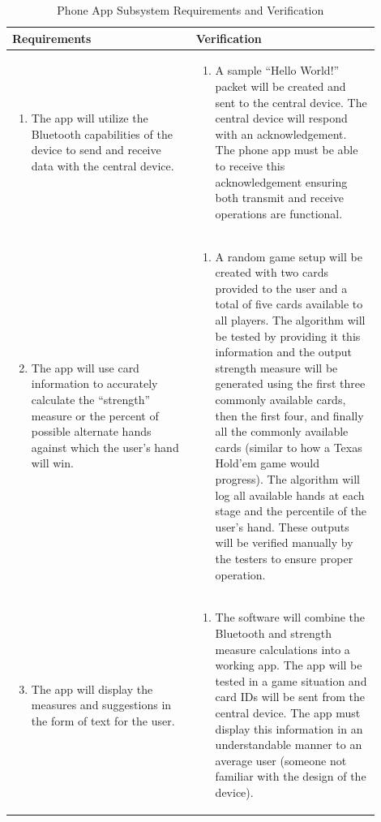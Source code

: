 \documentclass[12pt]{article}
\begin{document}
\begin{table}[!h]
	\caption{Phone App Subsystem Requirements and Verification}
	\label{tab:app_rv}
	\centering
	\begin{tabular}{| p{0.45\linewidth} | p{0.45\linewidth} |} 
 		\hline
 		\textbf{Requirements} & \textbf{Verification} \\ 
 		\hline
 		\begin{enumerate}
 			\item The app will utilize the Bluetooth capabilities of the device to send and receive data with the central device.
		\end{enumerate} & \begin{enumerate}[label=\alph*)]
 			\item A sample ``Hello World!'' packet will be created and sent to the central device. The central device will respond with an acknowledgement. The phone app must be able to receive this acknowledgement ensuring both transmit and receive operations are functional.
		\end{enumerate} \\
		\hline
		\begin{enumerate}
		\setcounter{enumi}{1}
 			\item The app will use card information to accurately calculate the ``strength'' measure or the percent of possible alternate hands against which the user's hand will win.
		\end{enumerate} & \begin{enumerate}[label=\alph*)]
 			\item A random game setup will be created with two cards provided to the user and a total of five cards available to all players. The algorithm will be tested by providing it this information and the output strength measure will be generated using the first three commonly available cards, then the first four, and finally all the commonly available cards (similar to how a Texas Hold'em game would progress). The algorithm will log all available hands at each stage and the percentile of the user's hand. These outputs will be verified manually by the testers to ensure proper operation. 
		\end{enumerate} \\
		\hline
		\begin{enumerate}
		\setcounter{enumi}{2}
 			\item The app will display the measures and suggestions in the form of text for the user.
		\end{enumerate} & \begin{enumerate}[label=\alph*)]
 			\item The software will combine the Bluetooth and strength measure calculations into a working app. The app will be tested in a game situation and card IDs will be sent from the central device. The app must display this information in an understandable manner to an average user (someone not familiar with the design of the device).
		\end{enumerate} \\
 		\hline
	\end{tabular}
\end{table}
\end{document}
